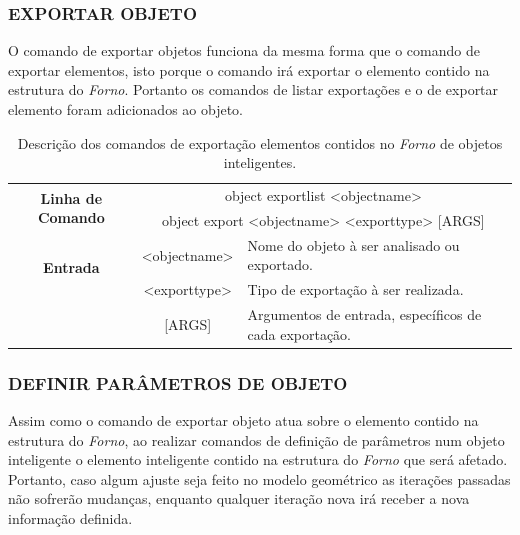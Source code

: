 \documentclass[a4paper,12pt]{monografia}
\theoremstyle{plain}
\theoremstyle{definition}
\theoremstyle{remark}
\begin{document}
\subsubsection{EXPORTAR OBJETO}\label{sec:export_object}

O comando de exportar objetos funciona da mesma forma que o comando de exportar elementos, isto porque o comando irá exportar o elemento contido na estrutura do \textit{Forno}. Portanto os comandos de listar exportações e o de exportar elemento foram adicionados ao objeto.

\begin{center}
	\begin{table}[!htbp]
		\begin{tabular}{|c|c|m{}|}
			\hline
			\multirow{2}{*}{\textbf{Linha de Comando}} & \multicolumn{2}{c|}{object export\underline{\space\space}list <object\underline{\space\space}name>} \\
			 & \multicolumn{2}{c|}{object export <object\underline{\space\space}name> <export\underline{\space\space}type> [ARGS]} \\
			\hline
			\multirow{2}{*}{\textbf{Entrada}} &  <object\underline{\space\space}name> & Nome do objeto à ser analisado ou exportado. \\
			&  <export\underline{\space\space}type> & Tipo de exportação à ser realizada. \\
			&  [ARGS] & Argumentos de entrada, específicos de cada exportação. \\
			\hline
		\end{tabular}
		\caption{Descrição dos comandos de exportação elementos contidos no \textit{Forno} de objetos inteligentes.}
		\label{tab:export_object}
	\end{table}
\end{center}

\subsubsection{DEFINIR PARÂMETROS DE OBJETO}\label{sec:set_field_object}

Assim como o comando de exportar objeto atua sobre o elemento contido na estrutura do \textit{Forno}, ao realizar comandos de definição de parâmetros num objeto inteligente o elemento inteligente contido na estrutura do \textit{Forno} que será afetado. Portanto, caso algum ajuste seja feito no modelo geométrico as iterações passadas não sofrerão mudanças, enquanto qualquer iteração nova irá receber a nova informação definida.
\end{document}
